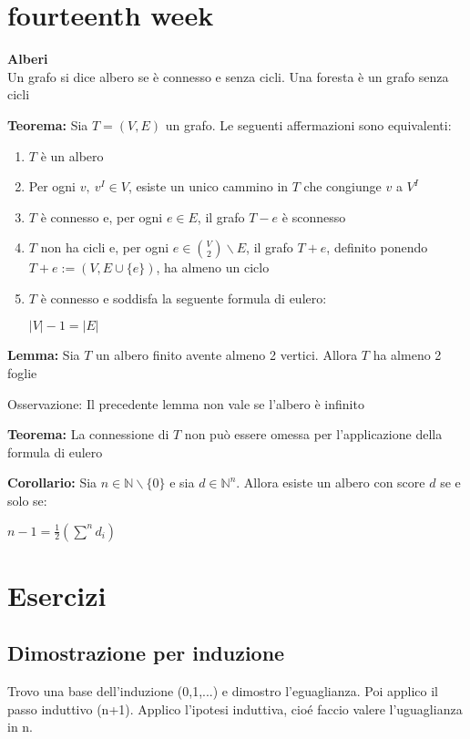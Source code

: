 \documentclass[11pt, letterpaper]{article}
\begin{document}
\newpage
\section{fourteenth week}
\textbf{Alberi}\\Un grafo si dice albero se è connesso e senza cicli. Una foresta è un grafo senza cicli

\textbf{Teorema:} Sia $T=(V,E)$ un grafo. Le seguenti affermazioni sono equivalenti:
\begin{enumerate}
    \item $T$ è un albero
    \item Per ogni $v,\ v^{I}\in V$, esiste un unico cammino in $T$ che congiunge $v$ a $V^{I}$
    \item $T$ è connesso e, per ogni $e\in E$, il grafo $T-e$ è sconnesso
    \item $T$ non ha cicli e, per ogni $e\in\binom{V}{2}\backslash E$, il grafo $T+e$, definito ponendo $T+e:=(V,
    E\cup\{e\})$, ha almeno un ciclo
    \item $T$ è connesso e soddisfa la seguente formula di eulero:
    \begin{center}
        $|V|-1=|E|$
    \end{center}
\end{enumerate} 

\textbf{Lemma:} Sia $T$ un albero finito avente almeno 2 vertici. Allora $T$ ha almeno 2 foglie

Osservazione: Il precedente lemma non vale se l'albero è infinito

\textbf{Teorema:} La connessione di $T$ non può essere omessa per l'applicazione della formula di eulero

\textbf{Corollario:} Sia $n\in\mathbb{N}\backslash\{0\}$ e sia $d\in\mathbb{N}^{n}$. Allora esiste un albero con 
score $d$ se e solo se:
\begin{center}
    $n-1=\frac{1}{2}(\sum^{n}d_{i})$
\end{center}

\newpage
\section{Esercizi}
\subsection{Dimostrazione per induzione}
Trovo una base dell'induzione (0,1,...) e dimostro l'eguaglianza. Poi applico il passo induttivo (n+1).
Applico l'ipotesi induttiva, cioé faccio valere l'uguaglianza in n. 
\end{document}

